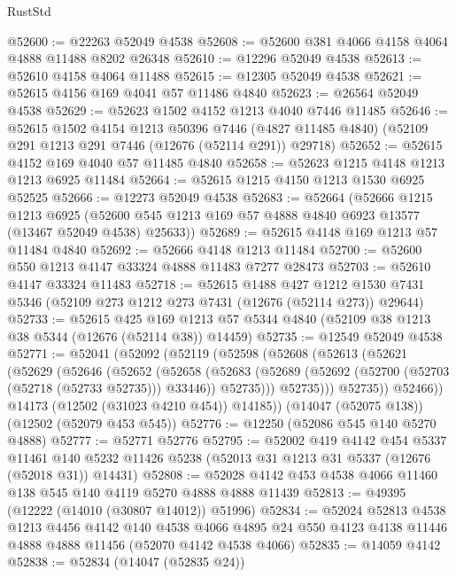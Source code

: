 \begin{lexlean}{RustStd}
\begin{coremodule}
@52600 := @22263 @52049 @4538
@52608 := @52600 @381 @4066 @4158 @4064 @4888 @11488 @8202 @26348
@52610 := @12296 @52049 @4538
@52613 := @52610 @4158 @4064 @11488
@52615 := @12305 @52049 @4538
@52621 := @52615 @4156 @169 @4041 @57 @11486 @4840
@52623 := @26564 @52049 @4538
@52629 := @52623 @1502 @4152 @1213 @4040 @7446 @11485
@52646 := @52615
    @1502
    @4154
    @1213
    @50396
    @7446
    (@4827 @11485 @4840)
    (@52109 @291 @1213 @291 @7446 (@12676 (@52114 @291)) @29718)
@52652 := @52615 @4152 @169 @4040 @57 @11485 @4840
@52658 := @52623 @1215 @4148 @1213 @1213 @6925 @11484
@52664 := @52615 @1215 @4150 @1213 @1530 @6925 @52525
@52666 := @12273 @52049 @4538
@52683 := @52664
    (@52666
      @1215
      @1213
      @6925
      (@52600 @545 @1213 @169 @57 @4888 @4840 @6923 @13577 (@13467 @52049 @4538) @25633))
@52689 := @52615 @4148 @169 @1213 @57 @11484 @4840
@52692 := @52666 @4148 @1213 @11484
@52700 := @52600 @550 @1213 @4147 @33324 @4888 @11483 @7277 @28473
@52703 := @52610 @4147 @33324 @11483
@52718 := @52615
    @1488
    @427
    @1212
    @1530
    @7431
    @5346
    (@52109 @273 @1212 @273 @7431 (@12676 (@52114 @273)) @29644)
@52733 := @52615
    @425
    @169
    @1213
    @57
    @5344
    @4840
    (@52109 @38 @1213 @38 @5344 (@12676 (@52114 @38)) @14459)
@52735 := @12549 @52049 @4538
@52771 := @52041
    (@52092
      (@52119
        (@52598
          (@52608
            (@52613
              (@52621
                (@52629
                  (@52646
                    (@52652
                      (@52658
                        (@52683
                          (@52689
                            (@52692 (@52700 (@52703 (@52718 (@52733 @52735))) @33446))
                            @52735)))
                      @52735)))
                @52735))
            @52466))
        @14173
        (@12502 (@31023 @4210 @454))
        @14185))
    (@14047 (@52075 @138))
    (@12502 (@52079 @453 @545))
@52776 := @12250 (@52086 @545 @140 @5270 @4888)
@52777 := @52771 @52776
@52795 := @52002
    @419
    @4142
    @454
    @5337
    @11461
    @140
    @5232
    @11426
    @5238
    (@52013 @31 @1213 @31 @5337 (@12676 (@52018 @31)) @14431)
@52808 := @52028 @4142 @453 @4538 @4066 @11460 @138 @545 @140 @4119 @5270 @4888 @4888 @11439
@52813 := @49395 (@12222 (@14010 (@30807 @14012)) @51996)
@52834 := @52024
    @52813
    @4538
    @1213
    @4456
    @4142
    @140
    @4538
    @4066
    @4895
    @24
    @550
    @4123
    @4138
    @11446
    @4888
    @4888
    @11456
    (@52070 @4142 @4538 @4066)
@52835 := @14059 @4142
@52838 := @52834 (@14047 (@52835 @24))

\end{coremodule}
\end{lexlean}

